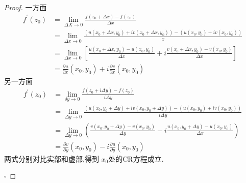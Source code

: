 \documentclass[../../复变函数.tex]{subfiles}
\begin{document}
\begin{proof}
    一方面 \[
   \begin{aligned}
    f^{\prime} \left( z_0 \right) &=  \lim_{ \Delta X \to 0}  \frac{f\left( z_0+  \Delta x \right)-f\left( z_0 \right)   }{ \Delta x }  \\ 
     & =  \lim_{ \Delta x \to 0} \frac{\left( u\left( x_0+  \Delta x,y_0 \right) +  i v\left( x_0+  \Delta x,y_0 \right)   \right) - \left( u\left( x_0,y_0 \right)+ iv\left( x_0,y_0 \right)   \right)   }{ x}\\ 
      & =  \lim_{ \Delta x \to 0}\left[  \frac{u\left( x_0+  \Delta x ,y_0\right)-u\left( x_0,y_0 \right)   }{ \Delta x }+ i \frac{v\left( x_0+  \Delta x,y_0 \right)-v\left( x_0,y_0 \right)   }{ \Delta x }   \right]   \\ 
        &=   \frac{\partial u}{\partial x}\left( x_0,y_0 \right) +  i \frac{\partial v}{\partial x}\left( x_0,y_0 \right)  
   \end{aligned}
    \]
    另一方面 \[
    \begin{aligned}
    f^{\prime} \left( z_0 \right)& =  \lim_{ \delta y \to 0} \frac{f\left( z_0+ i  \Delta y \right)-f\left( z_0 \right)   }{i \Delta y }\\ 
     & = \lim_{ \Delta  y \to 0} \frac{\left( u\left( x_0,y_0+  \Delta y \right)+ iv\left( x_0,y_0+  \Delta y \right)   \right)- \left( u\left( x_0,y_0 \right)+ iv\left( x_0,y_0 \right)   \right)   }{i  \Delta y }\\ 
       &= \lim_{ \Delta y \to 0} \left( \frac{v\left( x_0,y_0+  \Delta y \right)-v\left( x_0,y_0 \right)   }{ \Delta y } - i \frac{u\left( x_0,y_0+  \Delta y \right)- u\left( x_0,y_0 \right)   }{ \Delta x }  \right)      \\ 
        & =   \frac{\partial v}{\partial y}\left( x_0,y_0 \right)- i \frac{\partial u}{\partial y}\left( x_0,y_0 \right)  
    \end{aligned}
    \]两式分别对比实部和虚部,得到 \(  x_0  \)处的CR方程成立. 

    \hfill $\square$
\end{proof}
\end{document}
